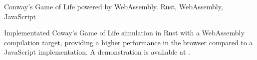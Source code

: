 \showoff
{}
{Conway's Game of Life powered by WebAssembly.}
{Rust, WebAssembly, JavaScript}
{}

Implementated Coway's Game of Life simulation in Rust with a WebAssembly compilation target, providing a higher performance in the browser compared to a JavaScript implementation. A demonstration is available at .

